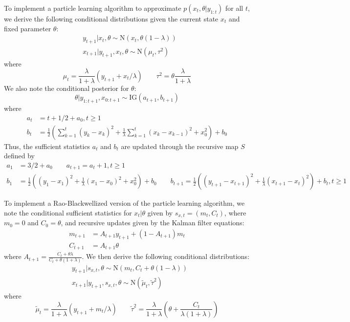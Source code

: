 \documentclass{article}
\begin{document}
To implement a particle learning algorithm to approximate $p(x_t,\theta|y_{1:t})$ for all $t$, we derive the following conditional distributions given the current state $x_t$ and fixed parameter $\theta$:
\begin{align*}
&y_{t+1}|x_t,\theta \sim \mbox{N}\left(x_t,\theta(1-\lambda)\right) \\
&x_{t+1}|y_{t+1},x_t,\theta \sim \mbox{N}(\mu_t,\tau^2)
\end{align*}
where \[\mu_t = \frac{\lambda}{1+\lambda}(y_{t+1} + x_t / \lambda) \qquad \tau^2 = \theta\frac{\lambda}{1+\lambda}\]
\noindent We also note the conditional posterior for $\theta$:
\begin{equation}
\theta|y_{1:t+1},x_{0:t+1} \sim \mbox{IG}(a_{t+1},b_{t+1})
\end{equation}
where
\begin{align*}
a_t &= t + 1/2 + a_0, t \ge 1 \\
b_t &= \frac{1}{2}\left(\sum_{k=1}^t (y_k - x_k)^2 + \frac{1}{\lambda}\sum_{k=1}^t (x_k - x_{k-1})^2 + x_0^2\right) + b_0
\end{align*}
Thus, the sufficient statistics $a_t$ and $b_t$ are updated through the recursive map $S$ defined by
\begin{align*}
a_1 &= 3/2 + a_0 \qquad a_{t+1} = a_t + 1, t \ge 1 \\
b_1 &= \frac{1}{2}\left((y_1-x_1)^2 + \frac{1}{\lambda}(x_1-x_0)^2 + x_0^2\right) + b_0 \qquad b_{t+1} = \frac{1}{2}\left((y_{t+1}-x_{t+1})^2 + \frac{1}{\lambda}(x_{t+1}-x_t)^2\right) + b_t, t \ge 1
\end{align*}

To implement a Rao-Blackwellized version of the particle learning algorithm, we note the conditional sufficient statistics for $x_t|\theta$ given by $s_{x,t} = (m_t, C_t)$, where $m_0 = 0$ and $C_0 = \theta$, and recursive updates given by the Kalman filter equations:
\begin{align*}
m_{t+1} &= A_{t+1}y_{t+1} + (1-A_{t+1})m_t \\
C_{t+1} &= A_{t+1}\theta
\end{align*}
where $A_{t+1} = \frac{C_t + \theta\lambda}{C_t + \theta(1+\lambda)}$. We then derive the following conditional distributions:
\begin{align*}
&y_{t+1}|s_{x,t},\theta \sim \mbox{N}\left(m_t, C_t + \theta(1-\lambda)\right) \\
&x_{t+1}|y_{t+1},s_{x,t},\theta \sim \mbox{N}(\tilde{\mu}_t,\tilde{\tau}^2)
\end{align*}
where \[\tilde{\mu}_t = \frac{\lambda}{1+\lambda}(y_{t+1} + m_t / \lambda) \qquad \tilde{\tau}^2 = \frac{\lambda}{1+\lambda}\left(\theta + \frac{C_t}{\lambda(1+\lambda)}\right)\]
\end{document}
